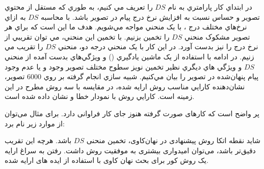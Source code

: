  در ابتداي کار پارامتري به نام {$DS$} را تعريف مي کنيم، به طوري که مستقل از محتوي تصوير و حساس نسبت به افزايش نرخ درج پيام در تصوير باشد. با محاسبه {$DS$} به ازاي نرخ‌هاي مختلف درج {}، با يک منحني مواجه مي‌شويم. هدف ما اين است که براي هر تصوير مشکوک منحني {$DS$} را تخمين بزنيم. با تخمين اين منحني، مي توان تقريبي از نرخ درج را نيز بدست آورد. در اين کار با يک منحني درجه دو، منحني {$DS$} را تقريب مي زنيم. در ادامه با استفاده از يک ماشين يادگيري ({}) و ويژگي‌هاي بدست آمده از منحني {$DS$} و ويژگي هاي ديگري نظير تخمين نويز سطوح مختلف تصوير وجود و يا عدم وجود پيام پنهان‌شده در تصوير را بيان مي‌کنيم. شبيه سازي انجام گرفته بر روي 6000 تصوير، نشان‌دهنده کارايي مناسب روش ارايه شده، در مقايسه با سه روش مطرح در اين زمينه است. کارايي روش با نمودار خطا و {} نشان داده شده است. 

پر واضح است که کارهای صورت گرفته هنوز جای کار فراوانی دارد. برای مثال می‌توان از موارد زیر نام برد:
\begin{itemize}
\incl
شاید نقطه اتکا روش پیشنهادی در نهان‌کاوی، تخمین منحنی {$DS$} باشد. هرچه این تقریب دقیق‌تر باشد، می‌توان امیدواری بیشتری به موفقیت روش داشت. 
\incl
رفتن به سراغ ارایه یک روش کور برای بحث نهان کاوی با استفاده از ایده های ارایه شده.
\end{itemize}










